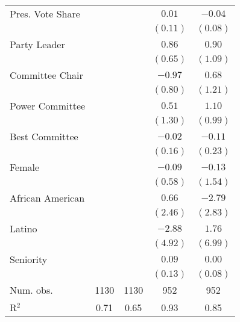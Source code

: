 \documentclass[12pt]{article}
\begin{document}
\begin{table}[!htbp]
\begin{threeparttable}
\begin{tabular}{l c c c c }
Pres. Vote Share                  &             &          & $0.01$      & $-0.04$      \\
                                  &             &          & $(0.11)$    & $(0.08)$     \\
Party Leader                      &             &          & $0.86$      & $0.90$       \\
                                  &             &          & $(0.65)$    & $(1.09)$     \\
Committee Chair                   &             &          & $-0.97$     & $0.68$       \\
                                  &             &          & $(0.80)$    & $(1.21)$     \\
Power Committee                   &             &          & $0.51$      & $1.10$       \\
                                  &             &          & $(1.30)$    & $(0.99)$     \\
Best Committee                    &             &          & $-0.02$     & $-0.11$      \\
                                  &             &          & $(0.16)$    & $(0.23)$     \\
Female                            &             &          & $-0.09$     & $-0.13$      \\
                                  &             &          & $(0.58)$    & $(1.54)$     \\
African American                  &             &          & $0.66$      & $-2.79$      \\
                                  &             &          & $(2.46)$    & $(2.83)$     \\
Latino                            &             &          & $-2.88$     & $1.76$       \\
                                  &             &          & $(4.92)$    & $(6.99)$     \\
Seniority                         &             &          & $0.09$      & $0.00$       \\
                                  &             &          & $(0.13)$    & $(0.08)$     \\
\hline
Num. obs.                         & 1130        & 1130     & 952         & 952          \\
R$^2$                             & 0.71        & 0.65     & 0.93        & 0.85         \\

\end{tabular}
\end{threeparttable}
\end{table}
\end{document}
